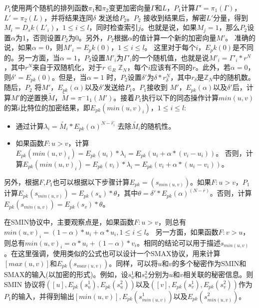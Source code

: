 $P_1$使用两个随机的排列函数$\pi_1$和$\pi_2$变更加密向量$\Gamma$和$L$，$P_1$计算$\Gamma'=\pi_1(\Gamma)$，$L'=\pi_2(L)$，并将结果连同$\delta$ 发送给$P_2$。$P_2$ 接收到结果后，解密$L'$分量，得到$M_i=D_sk(L'_i)$，$1\leq i \leq l$，同时检查索引$j$。也就是说，如果$M_j=1$，那么$P_2$设置$\alpha$为1，否则设置$P_2$为0。另外，$P_2$根据$\alpha$的值计算一个新的加密向量$M'$。 准确的说，如果$\alpha=0$，则$M'_i=E_pk(0)$，$1 \leq i \leq l$。 这里对于每个$i$，$E_pk(0)$是不同的。另一方面，当$\alpha=1$，$P_2$设置$M'_i$为$\Gamma'_i$的一个随机值，也就是说$M'_i = \Gamma'_i * r^N$，其中$r^N$来自于双随机化，对于$r\in_R \mathbb{Z}_N$，每个$i$应该有不同的$r$。此外，若$\alpha=0$，则$\delta'=E_{pk}(0)$。但是，当$\alpha=1$ 时，$P_2$设置$\delta'$为$\delta*r^N_\delta$，其中$r_\delta$是$\mathbb{Z}_N$中的随机数。随后，$P_2$ 将$M'$，$E_{pk}(\alpha)$以及$\delta'$发送给$P_1$。$P_1$接收到
$M'$，$E_{pk}(\alpha)$以及$\delta'$后，计算$M'$的逆置换$\tilde{M}$，$\tilde{M}=\pi^-1_1(M')$。接着$P_1$执行以下的同态操作计算$min(u,v)$的第$i$比特位的加密结果，即$E_{pk}(min(u,v)_i)$，$1 \leq i \leq l$:
\begin{itemize}
\item  通过计算$\lambda_i=\tilde{M_i}*E_{pk}(\alpha)^{N-\hat{r_i}}$ 去除$\tilde{M_i}$的随机性。
\item 如果函数$F:u>v$，计算$E_{pk}(min(u,v)_i)=E_{pk}(u_i)*\lambda_i=E_{pk}(u_i+\alpha*(v_i-u_i))$。 否则，计算$E_{pk}(min(u,v)_i)=E_{pk}(v_i)*\lambda_i=E_{pk}(v_i+\alpha*(u_i-v_i))$。

\end{itemize}
另外，根据$F$,$P_1$也可以根据以下步骤计算$E_{pk}=(s_{min(u,v)})$。如果$F:u>v$，$P_1$计算$E_{pk}(s_{min(u,v)})=E_{pk}(s_u)*\theta$，其中$\theta = \delta'*E_{pk}(\alpha)^(N-\bar{r})$。否则，计算$E_{pk}(s_{min(u,v)})=E_{pk}(s_v)*\theta$。

在SMIN协议中，主要观察点是，如果函数$F:u>v$，则总有$min(u,v)_i=(1-\alpha)*u_i+\alpha*u_i,1 \leq i \leq l$。 另一方面，如果函数$F:v>u$，则总有$min(u,v)_i=\alpha * u_i+(1-\alpha)*v_i$。相同的结论可以用于描述$s_{min(u,v)}$。在这里强调，使用类似的公式也可以设计一个SMAX协议，用来计算$[max(u,v)]$和$E_{pk}(s_{max(u,v)})$。同样，可以将$u$和$v$的多个秘密作为SMIN和SMAX的输入(以加密的形式)。例如，设$s^1_u$和$s^2_u$分别为$u$和$v$相关联的秘密信息。则SMIN 协议将$([u],E_{pk}(s^1_u),E_{pk}(s^2_u))$以及$([v],E_{pk}(s^1_v),E_{pk}(s^2_v))$作为$P_1$的输入，并得到输出$[min(u,v)],E_{pk}(s^1_{min(u,v)})$以及$E_{pk}(s^2_{min(u,v)})$。

